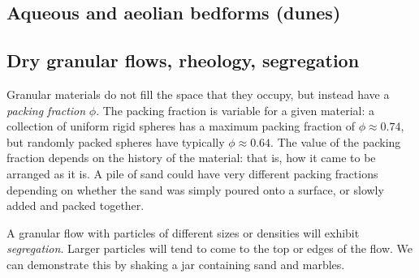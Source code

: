 \subsection{Aqueous and aeolian bedforms (dunes)}

\subsection{Dry granular flows, rheology, segregation}

Granular materials do not fill the space that they occupy, but instead have a \textit{packing fraction} $\phi$. The packing fraction is variable for a given material: a collection of uniform rigid spheres has a maximum packing fraction of $\phi\approx0.74$, but randomly packed spheres have typically $\phi\approx0.64$. The value of the packing fraction depends on the history of the material: that is, how it came to be arranged as it is. A pile of sand could have very different packing fractions depending on whether the sand was simply poured onto a surface, or slowly added and packed together. 

A granular flow with particles of different sizes or densities will exhibit \textit{segregation}. Larger particles will tend to come to the top or edges of the flow. We can demonstrate this by shaking a jar containing sand and marbles. 





